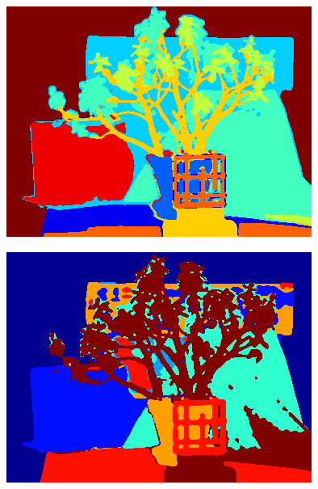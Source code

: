 \documentclass[a0,landscape]{a0poster}
\begin{document}
\begin{multicols}{4}
{ \centering
  \begin{minipage}{0.45\columnwidth}
    \centering
    \includegraphics[width=\textwidth]{./Images/Jadeplant/specClust.png}%
  \end{minipage}\hfill %
  \begin{minipage}{0.45\columnwidth}
    \centering
    \includegraphics[width=\textwidth]{./Images/Jadeplant/MBO.png}
  \end{minipage}
  \label{fig:DFCfig2}
}



\end{multicols}
\end{document}
